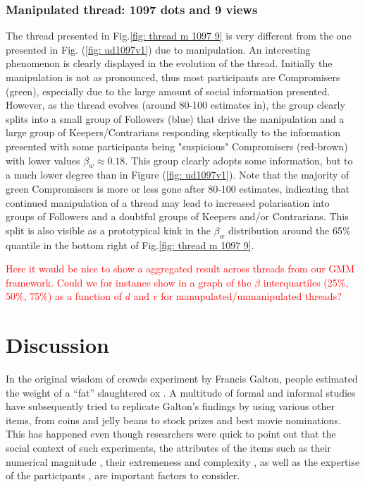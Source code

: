 \documentclass[9pt,twocolumn,twoside,lineno]{pnas-new}
\begin{document}

\subsubsection*{Manipulated thread: 1097 dots and 9 views}
The thread presented in Fig.\ref{fig: thread m 1097 9} is very different from the one presented in Fig. (\ref{fig: ud1097v1}) due to manipulation. An interesting phenomenon is clearly displayed in the evolution of the thread. Initially the manipulation is not as pronounced, thus most participants are Compromisers (green), especially due to the large amount of social information presented. However, as the thread evolves (around 80-100 estimates in), the group clearly splits into a small group of Followers (blue) that drive the manipulation and a large group of Keepers/Contrarians responding skeptically to the information presented with some participants being "suspicious" Compromisers (red-brown) with lower values $\beta_w\approx 0.18$. This group clearly adopts some information, but to a much lower degree than in Figure (\ref{fig: ud1097v1}). Note that the majority of green Compromisers is more or less gone after 80-100 estimates, indicating that continued manipulation of a thread may lead to increased polarisation into groups of Followers and a doubtful groups of Keepers and/or Contrarians. This split is also visible as a prototypical kink in the $\beta_w$ distribution around the 65\% quantile in the bottom right of Fig.\ref{fig: thread m 1097 9}.

\textcolor{red}{
Here it would be nice to show a aggregated result across threads from our GMM framework. Could we for instance show in a graph of the $\beta$ interquartiles (25\%, 50\%, 75\%)  as a function of $d$ and $v$ for manupulated/unmanipulated threads?
}

\section*{Discussion}
In the original wisdom of crowds experiment by Francis Galton, people estimated the weight of a “fat” slaughtered ox \cite{galton1907vox}. A multitude of formal and informal studies have subsequently tried to replicate Galton’s findings by using various other items, from coins and jelly beans to stock prizes and best movie nominations. This has happened even though researchers were quick to point out that the social context of such experiments, the attributes of the items such as their numerical magnitude \cite{izard2008calibrating, krueger1982single}, their extremeness and complexity \cite{nash2014curious, taleb2009errors}, as well as the expertise of the participants \cite{perry1907ballot}, are important factors to consider. 
\end{document}

